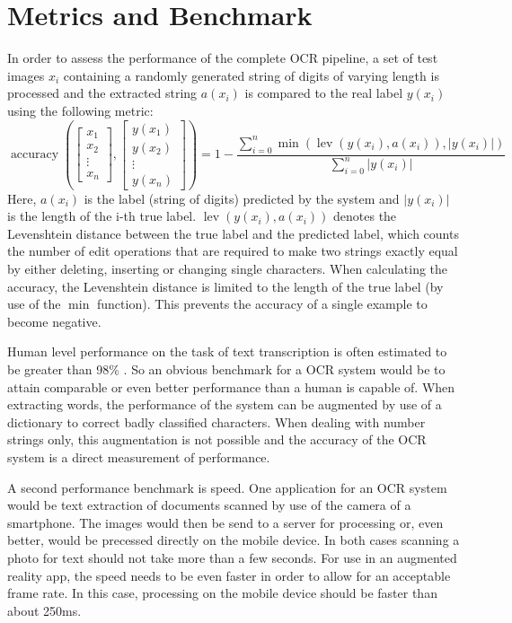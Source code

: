 \documentclass[12pt]{article}
\begin{document}
\section{Metrics and Benchmark}
\label{sec:metrics}
In order to assess the performance of the complete OCR pipeline, a set of test images $x_i$ containing
a randomly generated string of digits of varying length is processed and the extracted string $a(x_i)$ is
compared to the real label $y(x_i)$ using the following metric:
\begin{equation}
  \operatorname{accuracy}(\begin{bmatrix}x_{1}\\x_{2}\\\vdots\\x_{n}\end{bmatrix},\begin{bmatrix}y(x_{1})\\y(x_{2})\\\vdots\\y(x_{n})\end{bmatrix}) = 1 - \frac{\sum\limits_{i=0}^n{\operatorname{min}\left(\operatorname{lev}(y(x_i), a(x_i)), |y(x_i)|\right)}}{\sum\limits_{i=0}^n{|y(x_i)|}}
\end{equation}
Here, $a(x_i)$ is the label (string of digits) predicted by the system and $|y(x_i)|$ is the length of
the i-th true label. $\operatorname{lev}(y(x_i), a(x_i))$ denotes the Levenshtein distance \cite{Levensht20:online} between
the true label and the predicted label, which counts the number of edit operations
that are required to make two strings exactly equal by either deleting, inserting or
changing single characters. When calculating the accuracy, the Levenshtein distance is limited to
the length of the true label (by use of the $\operatorname{min}$ function). This prevents the accuracy
of a single example to become negative.

Human level performance on the task of text transcription is often estimated to be greater
than 98\% \cite{Goodfellow2013}. So an obvious benchmark for a OCR system would be to
attain comparable or even better performance than a human is capable of. When extracting words,
the performance of the system can be augmented by use of a dictionary to correct badly classified
characters. When dealing with number strings only, this augmentation is not possible and
the accuracy of the OCR system is a direct measurement of performance.

A second performance benchmark is speed. One application for an OCR system would be text extraction
of documents scanned by use of the camera of a smartphone. The images would then be send to
a server for processing or, even better, would be precessed directly on the mobile device.
In both cases scanning a photo for text should not take more than a few seconds. For use in
an augmented reality app, the speed needs to be even faster in order to allow for an acceptable
frame rate. In this case, processing on the mobile device should be faster than about
250ms.
\end{document}
